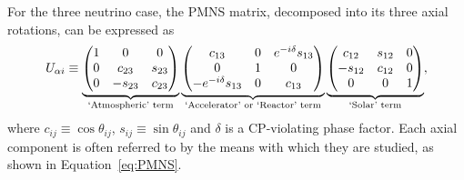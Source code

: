 For the three neutrino case, the PMNS matrix, decomposed into its three axial rotations, can be expressed as
\begin{equation}
  U_{\alpha i} \equiv
  \underbrace{
    \begin{pmatrix}
      1 & 0 & 0 \\
      0 & c_{23} & s_{23} \\
      0 & -s_{23} & c_{23} \\
    \end{pmatrix}
  }_{\textnormal{`Atmospheric' term}}
  \underbrace{
    \begin{pmatrix}
      c_{13} & 0 & e^{-i\delta} s_{13} \\
      0 & 1 & 0 \\
      -e^{-i\delta} s_{13} & 0 & c_{13} \\
    \end{pmatrix}
  }_{\textnormal{`Accelerator' or `Reactor' term}}
  \underbrace{
    \begin{pmatrix}
      c_{12} & s_{12} & 0 \\
      -s_{12} & c_{12} & 0 \\
      0 & 0 & 1 \\
    \end{pmatrix}
  }_{\textnormal{`Solar' term}}
  ,
  \label{eq:PMNS}
\end{equation}
where $c_{ij} \equiv \cos{\theta_{ij}}$, $s_{ij} \equiv \sin{\theta_{ij}}$ and $\delta$ is a CP-violating phase factor.  Each axial component is often referred to by the means with which they are studied, as shown in Equation~\ref{eq:PMNS}.

